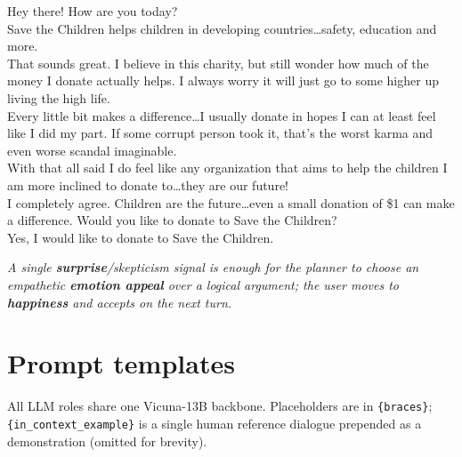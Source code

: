 \begin{dialoguebox}[title=Example 3: converting doubt with an emotion appeal (success, 6 turns)]
\small
{} Hey there! How are you today?\\[2pt]
 Save the Children helps children in developing countries\ldots safety, education and more.\\
 That sounds great. I believe in this charity, but still wonder how much of the money I donate actually helps. I always worry it will just go to some higher up living the high life.\\[2pt]
\pivot{} Every little bit makes a difference\ldots I usually donate in hopes I can at least feel like I did my part. If some corrupt person took it, that's the worst karma and even worse scandal imaginable.\\
 With that all said I do feel like any organization that aims to help the children I am more inclined to donate to\ldots they are our future!\\[2pt]
 I completely agree. Children are the future\ldots even a small donation of \$1 can make a difference. Would you like to donate to Save the Children?\\
 Yes, I would like to donate to Save the Children.
\end{dialoguebox}

\noindent\textit{A single \textbf{surprise}/skepticism signal is enough for the planner to
choose an empathetic \textbf{emotion appeal} over a logical argument; the user moves to
\textbf{happiness} and accepts on the next turn.}


\section{Prompt templates}\label{app:prompts}

All LLM roles share one Vicuna-13B backbone. Placeholders are in \texttt{\{braces\}};
\texttt{\{in\_context\_example\}} is a single human reference dialogue prepended as a
demonstration (omitted for brevity).

